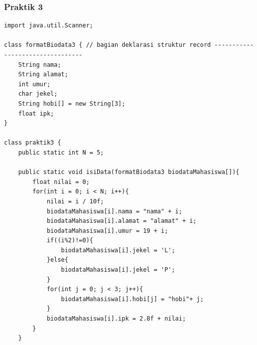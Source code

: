 \documentclass[a4paper,12pt]{article}
\begin{document}
\subsubsection{Praktik 3}
\begin{lstlisting}
import java.util.Scanner;

class formatBiodata3 { // bagian deklarasi struktur record ---------------------------------
    String nama;
    String alamat;
    int umur;
    char jekel;
    String hobi[] = new String[3];
    float ipk;
}

class praktik3 {
    public static int N = 5;

    public static void isiData(formatBiodata3 biodataMahasiswa[]){
        float nilai = 0;
        for(int i = 0; i < N; i++){
            nilai = i / 10f;
            biodataMahasiswa[i].nama = "nama" + i;
            biodataMahasiswa[i].alamat = "alamat" + i;
            biodataMahasiswa[i].umur = 19 + i;
            if((i%2)!=0){
                biodataMahasiswa[i].jekel = 'L';
            }else{
                biodataMahasiswa[i].jekel = 'P';
            }
            for(int j = 0; j < 3; j++){
                biodataMahasiswa[i].hobi[j] = "hobi"+ j;
            }
            biodataMahasiswa[i].ipk = 2.8f + nilai;
        }
    }


\end{lstlisting}
\end{document}
